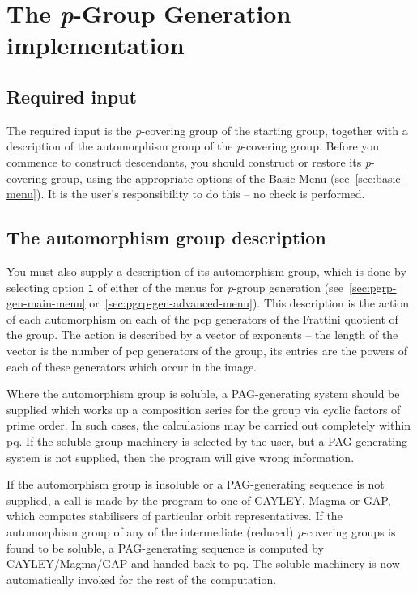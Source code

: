 \documentclass[12pt]{article}
\begin{document}
\section{The {\it p}-Group Generation implementation}
\subsection{Required input}
The required input is the {\it p}-covering group of the starting group,
together with a description of the automorphism group of the {\it p}-covering
group.
Before you commence to construct descendants,  
you should construct or restore its {\it p}-covering group,
using the appropriate options of the Basic Menu (see~\ref{sec:basic-menu}).
It is the user's responsibility to do this -- no check is performed.

\subsection{The automorphism group description}\label{sec:autgp-desc}
You must also supply a description of its automorphism group,
which is done by selecting option \texttt{1} of either 
of the menus for {\it p}-group generation
(see~\ref{sec:pgrp-gen-main-menu} or~\ref{sec:pgrp-gen-advanced-menu}).
This description is the action of each automorphism on each of the 
pcp generators of the Frattini quotient of the group.
The action is described by a vector of exponents -- the length
of the vector is the number of pcp generators of the group,
its entries are the powers of each of these generators 
which occur in the image.

Where the automorphism group is soluble, a PAG-generating system should 
be supplied which works up a composition series for the group via 
cyclic factors of prime order. In such cases, the calculations may be
carried out completely within pq.  If the soluble 
group machinery is selected by the user, but a PAG-generating system is 
not supplied, then the program will give wrong information.

If the automorphism group is insoluble or a PAG-generating sequence 
is not supplied, a call is made by the program to one of 
CAYLEY, {\sc Magma} or {\sf GAP}, which computes stabilisers of particular 
orbit representatives.
If the automorphism group of any of the intermediate (reduced) 
{\it p}-covering groups is found to be soluble, a PAG-generating sequence 
is computed by CAYLEY/{\sc Magma}/{\sf GAP} and handed back to pq.  The soluble machinery 
is now automatically invoked for the rest of the computation.
\end{document}
